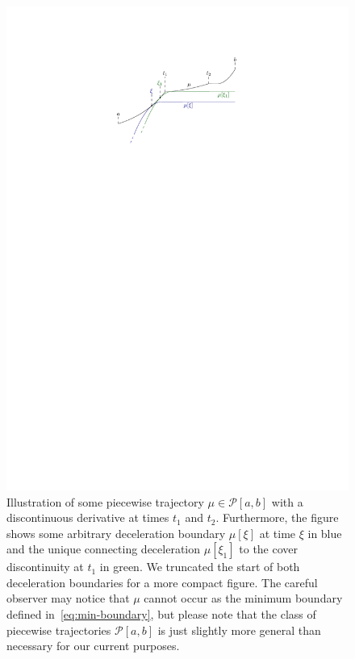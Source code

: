\documentclass[a4paper]{report}
\theoremstyle{definition}
\theoremstyle{plain}
\begin{document}
\begin{figure}
  \centering
  \includegraphics[scale=1.1]{figures/motion/deceleration-boundary}
  \caption{Illustration of some piecewise trajectory $\mu \in \mathcal{P}[a,b]$ with
    a discontinuous derivative at times $t_{1}$ and $t_{2}$. Furthermore, the
    figure shows some arbitrary deceleration boundary $\mu[\xi]$ at time $\xi$ in blue
    and the unique connecting deceleration $\mu[\xi_{1}]$ to the cover discontinuity at
    $t_{1}$ in green. We truncated the start of both deceleration boundaries for
    a more compact figure. The careful observer may notice that $\mu$ cannot occur
    as the minimum boundary defined in~\eqref{eq:min-boundary}, but please note that the class of
    piecewise trajectories $\mathcal{P}[a,b]$ is just slightly more general than
    necessary for our current purposes.}%
  \label{fig:deceleration-boundary}
\end{figure}
\end{document}
